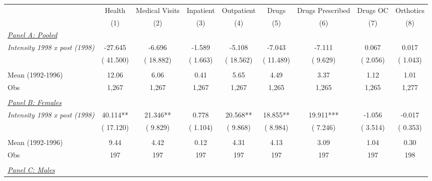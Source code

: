 \begin{tabular}{lcccccccc} \hline \hline
& \multicolumn{1}{c}{Health} & \multicolumn{1}{c}{Medical Visits} & \multicolumn{1}{c}{Inpatient} & \multicolumn{1}{c}{Outpatient} & \multicolumn{1}{c}{Drugs} & \multicolumn{1}{c}{Drugs Prescribed} & \multicolumn{1}{c}{Drugs OC} & \multicolumn{1}{c}{Orthotics}   \\ 
\cmidrule(lr){2-2}\cmidrule(lr){3-3}\cmidrule(lr){4-4} \cmidrule(lr){5-5}\cmidrule(lr){6-6}\cmidrule(lr){7-7}\cmidrule(lr){8-8} \cmidrule(lr){9-9} 
& (1) & (2) & (3) & (4) & (5) & (6) & (7) & (8) \\  \toprule
\underline{\textit{Panel A: Pooled}}  \\  
\textit{Intensity 1998 x post (1998)} &      -27.645  &       -6.696 &       -1.589 &       -5.108 &       -7.043  &       -7.111 &        0.067 &        0.017\\  
& (      41.500)  & (      18.882) & (       1.663) & (      18.562) & (      11.489)  & (       9.629) & (       2.056) & (       1.043) \\ 
 &  & &  &  &  &  &  & \\ 
Mean (1992-1996) &        12.06  &         6.06 &         0.41 &         5.65 &         4.49  &         3.37 &         1.12  &         1.01  \\  
Obs &        1,267  &        1,267 &        1,267 &        1,267 &        1,265  &        1,265 &        1,265  &        1,277 \\ 
 &  & &  &  &  &  &  & \\ 
\underline{\textit{Panel B: Females}}  \\  
\textit{Intensity 1998 x post (1998)} &       40.114**  &       21.346** &        0.778 &       20.568** &       18.855**  &       19.911*** &       -1.056 &       -0.017\\  
& (      17.120)  & (       9.829) & (       1.104) & (       9.868) & (       8.984)  & (       7.246) & (       3.514) & (       0.353) \\ 
 &  & &  &  &  &  &  & \\ 
Mean (1992-1996) &         9.44  &         4.42 &         0.12 &         4.31 &         4.13  &         3.09 &         1.04  &         0.30  \\  
Obs &          197  &          197 &          197 &          197 &          197  &          197 &          197  &          198 \\ 
 &  & &  &  &  &  &  & \\ 
\underline{\textit{Panel C: Males}}  \\  

\end{tabular}
